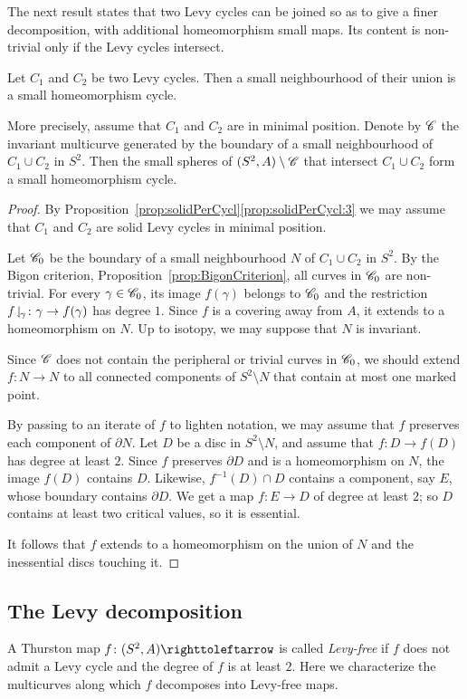 \documentclass{amsart}
\begin{document}
The next result states that two Levy cycles can be joined so as to
give a finer decomposition, with additional homeomorphism small
maps. Its content is non-trivial only if the Levy cycles intersect.
\begin{cor}\label{cor:IntOfLevyCycl}
  Let $C_1$ and $C_2$ be two Levy cycles. Then a small neighbourhood
  of their union is a small homeomorphism cycle.

  More precisely, assume that $C_1$ and $C_2$ are in minimal
  position. Denote by ${\mathscr C}$ the invariant multicurve generated by the
  boundary of a small neighbourhood of $C_1\cup C_2$ in $S^2$. Then
  the small spheres of $(S^2,A)\setminus{\mathscr C}$ that intersect
  $C_1\cup C_2$ form a small homeomorphism cycle.
\end{cor}
\begin{proof}
  By Proposition~\ref{prop:solidPerCycl}\eqref{prop:solidPerCycl:3} we
  may assume that $C_1$ and $C_2$ are solid Levy cycles in minimal
  position.

  Let ${\mathscr C}_0$ be the boundary of a small neighbourhood $N$ of
  $C_1\cup C_2$ in $S^2$. By the Bigon criterion,
  Proposition~\ref{prop:BigonCriterion}, all curves in ${\mathscr C}_0$ are
  non-trivial.  For every $\gamma\in{\mathscr C}_0$, its image $f(\gamma)$
  belongs to ${\mathscr C}_0$ and the restriction
  $f\!\downharpoonleft_{\!\gamma}\colon\gamma\to f(\gamma)$ has degree $1$. Since
  $f$ is a covering away from $A$, it extends to a homeomorphism on
  $N$. Up to isotopy, we may suppose that $N$ is invariant.

  Since ${\mathscr C}$ does not contain the peripheral or trivial curves in
  ${\mathscr C}_0$, we should extend $f\colon N\to N$ to all connected
  components of $S^2\setminus N$ that contain at most one marked
  point.

  By passing to an iterate of $f$ to lighten notation, we may assume
  that $f$ preserves each component of $\partial N$. Let $D$ be a
  disc in $S^2\setminus N$, and assume that $f\colon D\to f(D)$ has
  degree at least $2$. Since $f$ preserves $\partial D$ and is a
  homeomorphism on $N$, the image $f(D)$ contains $D$. Likewise,
  $f^{-1}(D)\cap D$ contains a component, say $E$, whose boundary
  contains $\partial D$. We get a map $f\colon E\to D$ of degree at
  least $2$; so $D$ contains at least two critical values, so it is
  essential.

  It follows that $f$ extends to a homeomorphism on the union of $N$
  and the inessential discs touching it.
\end{proof}

\subsection{The Levy decomposition}
A Thurston map $f\colon (S^2,A)\selfmap$ is called \emph{Levy-free} if
$f$ does not admit a Levy cycle and the degree of $f$ is at least
$2$. Here we characterize the multicurves along which $f$ decomposes
into Levy-free maps.
\end{document}

